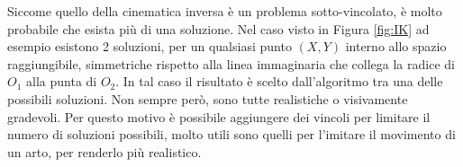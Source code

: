 Siccome quello della cinematica inversa è un problema sotto-vincolato, è molto probabile che esista più di una soluzione. Nel caso visto in Figura \ref{fig:IK} ad esempio esistono 2 soluzioni, per un qualsiasi punto $(X,Y)$ interno allo spazio raggiungibile, simmetriche rispetto alla linea immaginaria che collega la radice di $O_1$ alla punta di $O_2$.
In tal caso il risultato è scelto dall'algoritmo tra una delle possibili soluzioni. Non sempre però, sono tutte realistiche o visivamente gradevoli.
Per questo motivo è possibile aggiungere dei vincoli per limitare il numero di soluzioni possibili, molto utili sono quelli per l'imitare il movimento di un arto, per renderlo più realistico.


